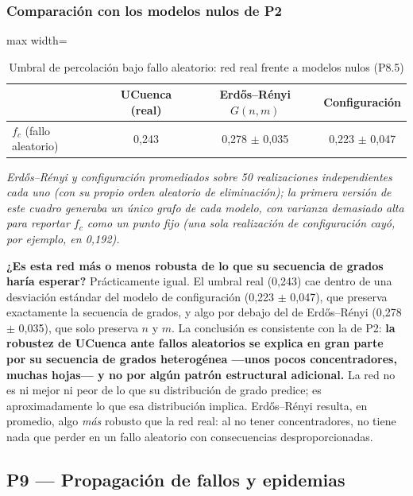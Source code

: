\documentclass[10pt,a4paper]{extarticle}
\begin{document}
\subsubsection{Comparación con los modelos nulos de P2}

\begin{table}[H]
\centering
\caption{Umbral de percolación bajo fallo aleatorio: red real frente a modelos nulos (P8.5)}
\label{tab:percnulos}
\small
\begin{adjustbox}{max width=\textwidth}
\begin{tabular}{lccc}
\toprule
& \textbf{UCuenca (real)} & \textbf{Erdős--Rényi $G(n,m)$} & \textbf{Configuración} \\
\midrule
$f_c$ (fallo aleatorio) & 0,243 & 0,278 $\pm$ 0,035 & 0,223 $\pm$ 0,047 \\
\bottomrule
\end{tabular}
\end{adjustbox}
\end{table}

\textit{Erdős--Rényi y configuración promediados sobre 50 realizaciones independientes cada
uno (con su propio orden aleatorio de eliminación); la primera versión de este cuadro
generaba un único grafo de cada modelo, con varianza demasiado alta para reportar $f_c$ como
un punto fijo (una sola realización de configuración cayó, por ejemplo, en 0,192).}

\textbf{¿Es esta red más o menos robusta de lo que su secuencia de grados haría esperar?}
Prácticamente igual. El umbral real (0,243) cae dentro de una desviación estándar del modelo
de configuración (0,223 $\pm$ 0,047), que preserva exactamente la secuencia de grados, y algo
por debajo del de Erdős--Rényi (0,278 $\pm$ 0,035), que solo preserva $n$ y $m$. La conclusión
es consistente con la de P2: \textbf{la robustez de UCuenca ante fallos aleatorios se explica
en gran parte por su secuencia de grados heterogénea ---unos pocos concentradores, muchas
hojas--- y no por algún patrón estructural adicional.} La red no es ni mejor ni peor de lo que
su distribución de grado predice; es aproximadamente lo que esa distribución implica.
Erdős--Rényi resulta, en promedio, algo \textit{más} robusto que la red real: al no tener
concentradores, no tiene nada que perder en un fallo aleatorio con consecuencias
desproporcionadas.

\subsection{P9 --- Propagación de fallos y epidemias}
\end{document}
